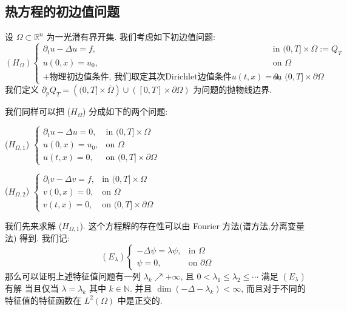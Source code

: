 \documentclass[11pt]{ctexart}[UTF8]
\begin{document}
\subsection{热方程的初边值问题}
设 $\Omega \subset \mathbb{R}^{n}$ 为一光滑有界开集. 我们考虑如下初边值问题:
\begin{equation*}
    (H_{\Omega})
    \begin{cases}
    \partial_{t} u - \Delta u = f, & \text{in } (0,T]\times\Omega:=Q_{T}\\
    u(0,x) = u_{0}, & \text{on }  \Omega\\
    +\text{物理初边值条件, 我们取定其次Dirichlet边值条件}u(t,x) = 0, & \text{on } (0,T]\times \partial\Omega
    \end{cases}
\end{equation*}
我们定义 $\partial_{p}Q_{T} = \left((0,T]\times \overline{\Omega}\right)\cup\left( [0,T]\times\partial\Omega \right)$ 为问题的抛物线边界.\par
我们同样可以把 ($H_{\Omega}$) 分成如下的两个问题:\par
($H_{\Omega,1}$) $\begin{cases}
    \partial_{t} u - \Delta u = 0, & \text{in } (0,T]\times\Omega\\
    u(0,x) = u_{0}, & \text{on }  \Omega\\
u(t,x) = 0, & \text{on } (0,T]\times \partial\Omega
\end{cases}$\par
($H_{\Omega,2}$) $\begin{cases}
    \partial_{t} v - \Delta v = f, & \text{in } (0,T]\times\Omega\\
    v(0,x) = 0, & \text{on }  \Omega\\
v(t,x) = 0, & \text{on } (0,T]\times \partial\Omega
\end{cases}$\par
我们先来求解 ($H_{\Omega,1}$). 这个方程解的存在性可以由 Fourier 方法(谱方法,分离变量法) 得到. 我们记:
\begin{equation*}
    (E_{\lambda})
    \begin{cases}
        -\Delta \psi = \lambda \psi, & \text{in } \Omega\\
        \psi = 0, & \text{on } \partial\Omega
    \end{cases}
\end{equation*}
那么可以证明上述特征值问题有一列 $\lambda_{k} \nearrow +\infty$, 且 $0<\lambda_1 \leq \lambda_2 \leq \cdots$ 满足 $(E_{\lambda})$ 有解
当且仅当 $\lambda = \lambda_k$ 其中 $k \in \mathbb{N}$. 并且 $\dim(-\Delta - \lambda_{k}) < \infty$, 而且对于不同的特征值的特征函数在 $L^2(\Omega)$ 中是正交的. 
\end{document}
